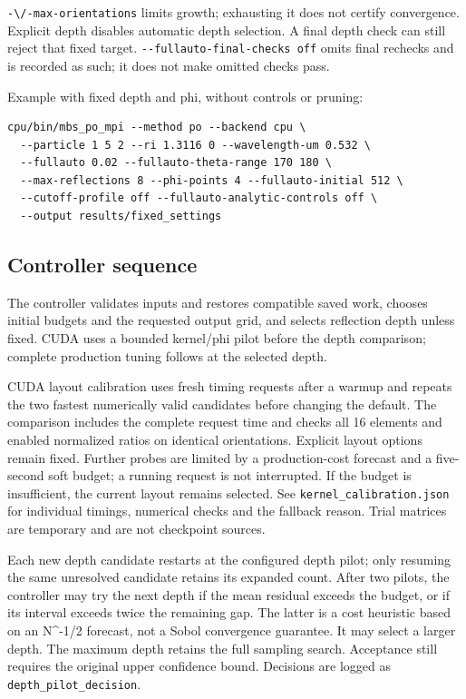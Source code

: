 \nolinkurl{-\/-max-orientations} limits growth; exhausting it does not
certify convergence. Explicit depth disables automatic depth selection.
A final depth check can still reject that fixed target.
\texttt{-\/-fullauto-final-checks\ off} omits final rechecks and is
recorded as such; it does not make omitted checks pass.

Example with fixed depth and phi, without controls or pruning:

\noindent\begin{minipage}{\linewidth}
\begin{verbatim}
cpu/bin/mbs_po_mpi --method po --backend cpu \
  --particle 1 5 2 --ri 1.3116 0 --wavelength-um 0.532 \
  --fullauto 0.02 --fullauto-theta-range 170 180 \
  --max-reflections 8 --phi-points 4 --fullauto-initial 512 \
  --cutoff-profile off --fullauto-analytic-controls off \
  --output results/fixed_settings
\end{verbatim}
\end{minipage}

\subsection{Controller sequence}\label{controller-sequence}

The controller validates inputs and restores compatible saved work,
chooses initial budgets and the requested output grid, and selects
reflection depth unless fixed. CUDA uses a bounded kernel/phi pilot
before the depth comparison; complete production tuning follows at the
selected depth.

CUDA layout calibration uses fresh timing requests after a warmup and
repeats the two fastest numerically valid candidates before changing the
default. The comparison includes the complete request time and checks
all 16 elements and enabled normalized ratios on identical orientations.
Explicit layout options remain fixed. Further probes are limited by a
production-cost forecast and a five-second soft budget; a running
request is not interrupted. If the budget is insufficient, the current
layout remains selected. See \nolinkurl{kernel_calibration.json} for
individual timings, numerical checks and the fallback reason. Trial
matrices are temporary and are not checkpoint sources.

Each new depth candidate restarts at the configured depth pilot; only
resuming the same unresolved candidate retains its expanded count. After
two pilots, the controller may try the next depth if the mean residual
exceeds the budget, or if its interval exceeds twice the remaining gap.
The latter is a cost heuristic based on an N\^{}-1/2 forecast, not a
Sobol convergence guarantee. It may select a larger depth. The maximum
depth retains the full sampling search. Acceptance still requires the
original upper confidence bound. Decisions are logged as
\nolinkurl{depth_pilot_decision}.

